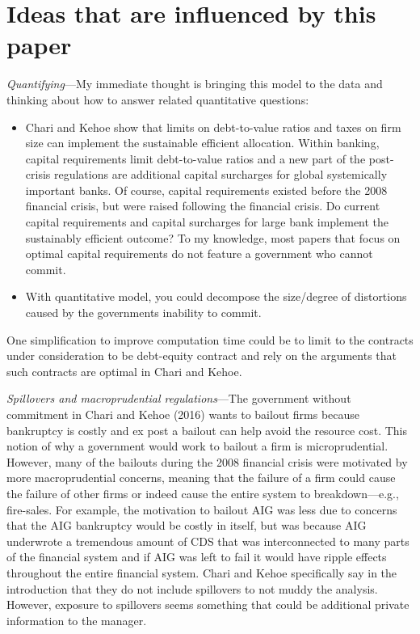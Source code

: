 \documentclass{article}
\begin{document}
\section{Ideas that are influenced by this paper}

\textit{Quantifying}---My immediate thought is bringing this model to the data and thinking about how to answer related quantitative questions:
\begin{itemize}
\item Chari and Kehoe show that limits on debt-to-value ratios and taxes on firm size can implement the sustainable efficient allocation.  Within banking, capital requirements limit debt-to-value ratios and a new part of the post-crisis regulations are additional capital surcharges for global systemically important banks. Of course, capital requirements existed before the 2008 financial crisis, but were raised following the financial crisis.  Do current capital requirements and capital surcharges for large bank implement the sustainably efficient outcome?  To my knowledge, most papers that focus on optimal capital requirements do not feature a government who cannot commit.
\item With quantitative model, you could decompose the size/degree of distortions caused by the governments inability to commit.
\end{itemize}
One simplification to improve computation time could be to limit to the contracts under consideration to be debt-equity contract and rely on the arguments that such contracts are optimal in Chari and Kehoe.

\textit{Spillovers and macroprudential regulations}---The government without commitment in Chari and Kehoe (2016) wants to bailout firms because bankruptcy is costly and ex post a bailout can help avoid the resource cost.  This notion of why a government would work to bailout a firm is microprudential. However, many of the bailouts during the 2008 financial crisis were motivated by more macroprudential concerns, meaning that the failure of a firm could cause the failure of other firms or indeed cause the entire system to breakdown---e.g., fire-sales.  For example, the motivation to bailout AIG was less due to concerns that the AIG bankruptcy would be costly in itself, but was because AIG underwrote a tremendous amount of CDS that was interconnected to many parts of the financial system and if AIG was left to fail it would have ripple effects throughout the entire financial system.  Chari and Kehoe specifically say in the introduction that they do not include spillovers to not muddy the analysis. However, exposure to spillovers seems something that could be additional private information to the manager.
\end{document}

